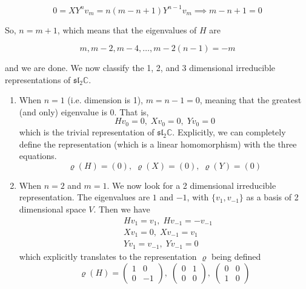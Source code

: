 \documentclass{article}
\begin{document}
      \[0 = X Y^n v_m = n (m-n+1) Y^{n-1} v_m \implies m-n+1=0\]

    So, $n = m+1$, which means that the eigenvalues of $H$ are

      \[m, m-2, m-4, \ldots, m - 2(n-1) = -m\]

    and we are done. We now classify the 1, 2, and 3 dimensional irreducible representations of $\mathfrak{sl}_2 \mathbb{C}$. 
    \begin{enumerate}
      \item When $n = 1$ (i.e. dimension is 1), $m = n-1 = 0$, meaning that the greatest (and only) eigenvalue is $0$. That is, 
      \[H v_0 = 0,\; X v_0 = 0,\; Y v_0 = 0\]
      which is the trivial representation of $\mathfrak{sl}_2 \mathbb{C}$. Explicitly, we can completely define the representation (which is a linear homomorphism) with the three equations. 
      \[\varrho(H) = (0),\; \varrho(X) = (0),\; \varrho(Y) = (0)\]

      \item When $n = 2$ and $m=1$. We now look for a 2 dimensional irreducible representation. The eigenvalues are $1$ and $-1$, with $\{v_1, v_{-1}\}$ as a basis of 2 dimensional space $V$. Then we have 
        \begin{align*}
          & Hv_1 = v_1, \; Hv_{-1} = - v_{-1} \\
          & X v_1 = 0, \; X v_{-1} = v_1 \\
          & Y v_1 = v_{-1}, \; Y v_{-1} = 0
        \end{align*}
      which explicitly translates to the representation $\varrho$ being defined
        \[\varrho(H) = \begin{pmatrix}
        1&0\\0&-1
        \end{pmatrix}, \; \begin{pmatrix}
        0&1\\0&0
        \end{pmatrix}, \; \begin{pmatrix}
        0&0\\1&0
        \end{pmatrix}\]


\end{enumerate}
\end{document}
